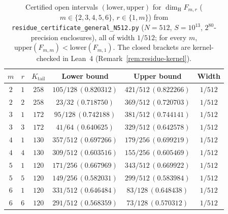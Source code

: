 \documentclass[11pt]{article}
\theoremstyle{definition}
\theoremstyle{remark}
\newcommand{\dimH}{\dim_{\mathrm{H}}}
\begin{document}
\begin{table}[ht]
\centering\small
\begin{tabular}{c|c|c|c|c|c}
$m$ & $r$ & $K_{\mathrm{tail}}$ & Lower bound & Upper bound & Width \\\hline
$2$ & $1$ & $258$ & $105/128\,(0.820312)$ & $421/512\,(0.822266)$ & $1/512$ \\
$2$ & $2$ & $258$ & $23/32\,(0.718750)$ & $369/512\,(0.720703)$ & $1/512$ \\\hline
$3$ & $1$ & $172$ & $95/128\,(0.742188)$ & $381/512\,(0.744141)$ & $1/512$ \\
$3$ & $3$ & $172$ & $41/64\,(0.640625)$ & $329/512\,(0.642578)$ & $1/512$ \\\hline
$4$ & $1$ & $130$ & $357/512\,(0.697266)$ & $179/256\,(0.699219)$ & $1/512$ \\
$4$ & $4$ & $130$ & $309/512\,(0.603516)$ & $155/256\,(0.605469)$ & $1/512$ \\\hline
$5$ & $1$ & $120$ & $171/256\,(0.667969)$ & $343/512\,(0.669922)$ & $1/512$ \\
$5$ & $5$ & $120$ & $149/256\,(0.582031)$ & $299/512\,(0.583984)$ & $1/512$ \\\hline
$6$ & $1$ & $120$ & $331/512\,(0.646484)$ & $83/128\,(0.648438)$ & $1/512$ \\
$6$ & $6$ & $120$ & $291/512\,(0.568359)$ & $73/128\,(0.570312)$ & $1/512$
\end{tabular}
\caption{Certified open intervals $(\mathrm{lower},\mathrm{upper})$ for $\dimH F_{m,r}$ ($m\in\{2,3,4,5,6\}$, $r\in\{1,m\}$) from \texttt{residue\_\allowbreak certificate\_\allowbreak general\_\allowbreak N512.py} ($N=512$, $S=10^{13}$, $2^{80}$-precision enclosures), all of width $1/512$; for every $m$, $\mathrm{upper}(F_{m,m})<\mathrm{lower}(F_{m,1})$. The closed brackets are kernel-checked in Lean~4 (Remark~\ref{rem:residue-kernel}).}\label{tab:residues-general}
\end{table}
\end{document}
